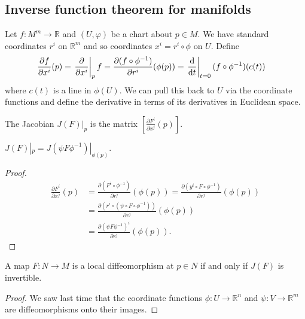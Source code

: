 \subsection{Inverse function theorem for manifolds}
Let $f : M^m \to \mathbb{R}$ and $(U, \varphi)$ be a chart about
$p \in M$. We have standard coordinates $r^i$ on $\mathbb{R}^m$
and so coordinates $x^i = r^i \circ \phi$ on $U$. Define
\begin{align*}
   \frac{\partial f}{\partial x^i}(p)
&= \left.\frac{\partial}{\partial x^i}\right|_p f
 = \frac{\partial (f \circ \phi^{-1})}{\partial r^i}(\phi(p))
 = \left.\frac{\mathop{}\!\mathrm{d}}{\mathop{}\!\mathrm{d} t}\right|_{t = 0} (f \circ \phi^{-1})(c(t))
\end{align*}
where $c(t)$ is a line in $\phi(U)$. We can pull this back to $U$ via the
coordinate functions and define the derivative in terms of its
derivatives in Euclidean space.

\begin{defn}[Jacobian]
The Jacobian $J(F)|_p$ is the matrix
$\left[\frac{\partial F^i}{\partial x^j}(p)\right]$.
\end{defn}

\begin{prop}
$J(F)|_p = J(\psi F \phi^{-1})|_{\phi(p)}$.
\end{prop}

\begin{proof}
  \begin{align*}
     \frac{\partial F^i}{\partial x^j}(p)
  &= \frac{\partial (F^i \circ \phi^{-1})}{\partial r^j}(\phi(p))
   = \frac{\partial (y^i \circ F \circ \phi^{-1})}
          {\partial r^j}(\phi(p)) \\
  &= \frac{\partial (r^i \circ (\psi \circ F \circ \phi^{-1}))}
          {\partial r^j}(\phi(p)) \\
  &= \frac{\partial (\psi F \phi^{-1})^i}
          {\partial r^j}(\phi(p)).
  \end{align*}
\end{proof}

\begin{corol}
A map $F: N \to M$ is a local diffeomorphism at $p \in N$ if and only
if $J(F)$ is invertible.
\end{corol}

\begin{proof}
  We saw last time that the coordinate functions $\phi : U \to \mathbb{R}^n$ and
  $\psi : V \to \mathbb{R}^m$ are diffeomorphisms onto their images.
\end{proof}
